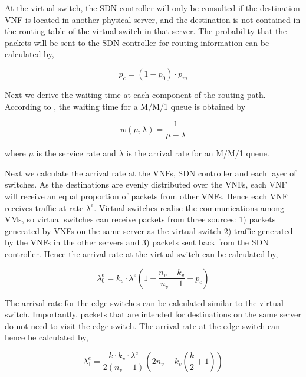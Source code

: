 At the virtual switch, the SDN controller will only be consulted if the destination VNF is located in another physical server, and the destination is not contained in the routing table of the virtual switch in that server. The probability that the packets will be sent to the SDN controller for routing information can be calculated by,

\begin{equation}
    \label{eq:p_sdn}
    p_{c} = (1 - p_{0}) \cdot p_m
\end{equation}

Next we derive the waiting time at each component of the routing path. According to \cite{Kleinrock75}, the waiting time for a M/M/1 queue is obtained by

\begin{equation}
    \label{eq:p_latency}
    w(\mu, \lambda) = \frac{1}{\mu - \lambda}
\end{equation}

\noindent where $\mu$ is the service rate and $\lambda$ is the arrival rate for an M/M/1 queue.

Next we calculate the arrival rate at the VNFs, SDN controller and each layer of switches. As the destinations are evenly distributed over the VNFs, each VNF will receive an equal proportion of packets from other VNFs. Hence each VNF receives traffic at rate $\lambda^e$. Virtual switches realise the communications among VMs, so virtual switches can receive packets from three sources: 1) packets generated by VNFs on the same server as the virtual switch 2) traffic generated by the VNFs in the other servers and 3) packets sent back from the SDN controller. Hence the arrival rate at the virtual switch can be calculated by,

\begin{equation}
    \label{eq:arr_srv}
    \lambda_0^e = k_v \cdot \lambda^e \left(1+\frac{n_v - k_v}{n_v - 1} + p_c \right)
\end{equation}

The arrival rate for the edge switches can be calculated similar to the virtual switch. Importantly, packets that are intended for destinations on the same server do not need to visit the edge switch. The arrival rate at the edge switch can hence be calculated by,

\begin{equation}
    \label{eq:arr_edge}
    \lambda_1^e = \frac{k \cdot k_v \cdot \lambda^e}{2(n_v - 1)}\left(2n_v - k_v \left(\frac{k}{2} + 1 \right)\right)
\end{equation}

